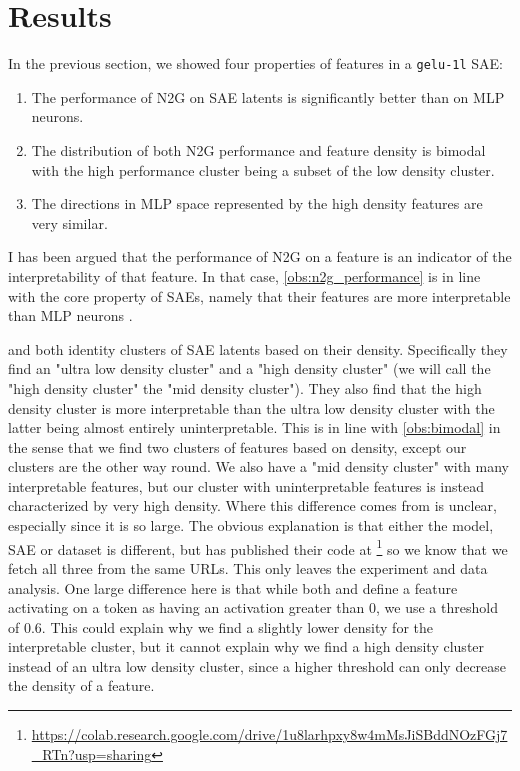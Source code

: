 \section{Results}
In the previous section, we showed four properties of features in a \texttt{gelu-1l} SAE: 
\begin{enumerate}[ref={observation~\arabic*}]
    \item The performance of N2G on SAE latents is significantly better than on MLP neurons.\label{obs:n2g_performance}
    \item The distribution of both N2G performance and feature density is bimodal with the high performance cluster being a subset of the low density cluster.\label{obs:bimodal}
    \item The directions in MLP space represented by the high density features are very similar.\label{obs:directions}
\end{enumerate}
I has been argued \parencite{gao_scaling_2024}  that the performance of N2G on a feature is an indicator of the interpretability of that feature.
In that case, \ref{obs:n2g_performance} is in line with the core property of SAEs, namely that their features are more interpretable than MLP neurons \parencite{cunningham_sparse_2023}\parencite{bricken_towards_2023}.

\textcite{bricken_towards_2023} and \textcite{nanda_open_2023} both identity clusters of SAE latents based on their density.
Specifically they find an "ultra low density cluster" and a "high density cluster" (we will call the "high density cluster" the "mid density cluster").
They also find that the high density cluster is more interpretable than the ultra low density cluster with the latter being almost entirely uninterpretable.
This is in line with \ref{obs:bimodal} in the sense that we find two clusters of features based on density, except our clusters are the other way round.
We also have a "mid density cluster" with many interpretable features, but our cluster with uninterpretable features is instead characterized by very high density.
Where this difference comes from is unclear, especially since it is so large.
The obvious explanation is that either the model, SAE or dataset is different, but \textcite{nanda_open_2023} has published their code at \footnote{\url{https://colab.research.google.com/drive/1u8larhpxy8w4mMsJiSBddNOzFGj7_RTn?usp=sharing}} so we know that we fetch all three from the same URLs.
This only leaves the experiment and data analysis.
One large difference here is that while both \textcite{bricken_towards_2023} and \textcite{nanda_open_2023} define a feature activating on a token as having an activation greater than $0$, we use a threshold of $0.6$.
This could explain why we find a slightly lower density for the interpretable cluster, but it cannot explain why we find a high density cluster instead of an ultra low density cluster, since a higher threshold can only decrease the density of a feature.


